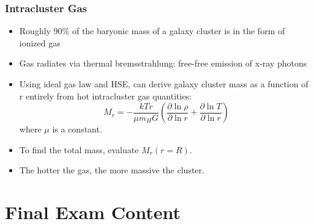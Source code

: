 \documentclass{book}
\begin{document}
\subsection{Intracluster Gas}
\begin{itemize}
    \item Roughly 90\% of the baryonic mass of a galaxy cluster is in the form of ionized gas
    \item Gas radiates via thermal bremsstrahlung: free-free emission of x-ray photons
    \item Using ideal gas law and HSE, can derive galaxy cluster mass as a function of r entirely from hot intracluster gas quantities: $$M_r = - \frac{k T r}{\mu m_H G} \left( \frac{\partial \ln \rho}{\partial \ln r} + \frac{\partial \ln T}{\partial \ln r}\right)$$ where $\mu$ is a constant.
    \item To find the total mass, evaluate $M_r (r = R)$.
    \item The hotter the gas, the more massive the cluster.
\end{itemize}
\chapter{Final Exam Content}

\backmatter
\end{document}
